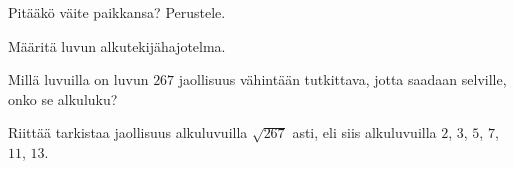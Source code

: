 \begin{tehtava}
    Pitääkö väite paikkansa? Perustele.
    
    \begin{alakohdat}
    \end{alakohdat}

    \begin{vastaus}
    
        \begin{alakohdat}
        \end{alakohdat}
    \end{vastaus}
    
\end{tehtava}

\begin{tehtava}
    Määritä luvun alkutekijähajotelma.

    \begin{alakohdat}
    \end{alakohdat}

    \begin{vastaus}
        \begin{alakohdat}
        \end{alakohdat}
    \end{vastaus}
    
\end{tehtava}

\begin{tehtava}
    Millä luvuilla on luvun $267$ jaollisuus vähintään tutkittava, jotta saadaan selville, onko se alkuluku?
    
    \begin{vastaus}
        Riittää tarkistaa jaollisuus alkuluvuilla $\sqrt{267}$ asti, eli siis alkuluvuilla $2$, $3$, $5$, $7$, $11$, $13$.
    \end{vastaus}
    
\end{tehtava}

